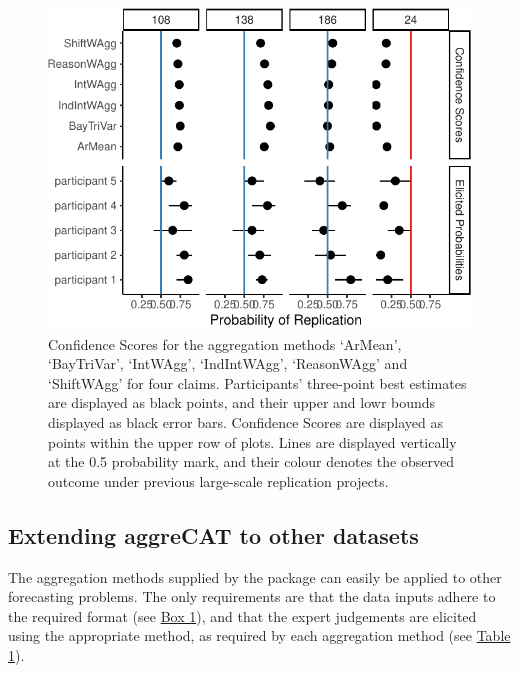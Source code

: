 \documentclass[article]{jss}
\begin{document}
\begin{figure}

{\centering \includegraphics{aggreCAT_files/figure-pdf/fig-aggregation-1.pdf}

}

\caption{\label{fig-aggregation}Confidence Scores for the aggregation
methods `ArMean', `BayTriVar', `IntWAgg', `IndIntWAgg', `ReasonWAgg' and
`ShiftWAgg' for four claims. Participants' three-point best estimates
are displayed as black points, and their upper and lowr bounds displayed
as black error bars. Confidence Scores are displayed as points within
the upper row of plots. Lines are displayed vertically at the 0.5
probability mark, and their colour denotes the observed outcome under
previous large-scale replication projects.}

\end{figure}

\hypertarget{extending-aggrecat-to-other-datasets}{%
\subsection{Extending aggreCAT to other
datasets}\label{extending-aggrecat-to-other-datasets}}

The aggregation methods supplied by the  package can
easily be applied to other forecasting problems. The only requirements
are that the data inputs adhere to the required format (see
\protect\hyperlink{aggWorkflow}{Box 1}), and that the expert judgements
are elicited using the appropriate method, as required by each
aggregation method (see \protect\hyperlink{table1}{Table 1}).
\end{document}
